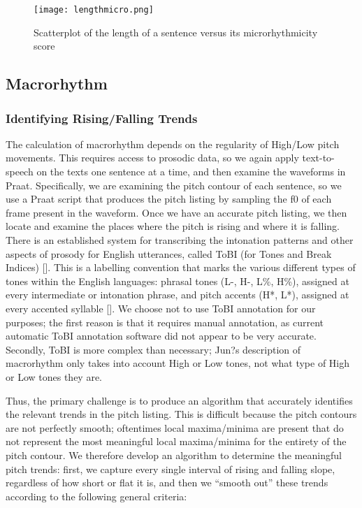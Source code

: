 \documentclass[pageno]{jpaper}
\newcommand{\quotes}[1]{``#1''}
\begin{document}
\begin{figure}[hbt]
\centering
\texttt{[image: lengthmicro.png]}
\caption{Scatterplot of the length of a sentence versus its microrhythmicity score}
\label{fig:lengthmicro}
\end{figure}

\subsection{Macrorhythm}
\subsubsection{Identifying Rising/Falling Trends}
The calculation of macrorhythm depends on the regularity of High/Low pitch movements. This requires access to prosodic data, so we again apply text-to-speech on the texts one sentence at a time, and then examine the waveforms in Praat. Specifically, we are examining the pitch contour of each sentence, so we use a Praat script that produces the pitch listing by sampling the f0 of each frame present in the waveform. Once we have an accurate pitch listing, we then locate and examine the places where the pitch is rising and where it is falling. There is an established system for transcribing the intonation patterns and other aspects of prosody for English utterances, called ToBI (for Tones and Break Indices) []. This is a labelling convention that marks the various different types of tones within the English languages: phrasal tones (L-, H-, L\%, H\%), assigned at every intermediate or intonation phrase, and pitch accents (H*, L*), assigned at every accented syllable []. We choose not to use ToBI annotation for our purposes; the first reason is that it requires manual annotation, as current automatic ToBI annotation software did not appear to be very accurate. Secondly, ToBI is more complex than necessary; Jun?s description of macrorhythm only takes into account High or Low tones, not what type of High or Low tones they are. 

Thus, the primary challenge is to produce an algorithm that accurately identifies the relevant trends in the pitch listing. This is difficult because the pitch contours are not perfectly smooth; oftentimes local maxima/minima are present that do not represent the most meaningful local maxima/minima for the entirety of the pitch contour. We therefore develop an algorithm to determine the meaningful pitch trends: first, we capture every single interval of rising and falling slope, regardless of how short or flat it is, and then we \quotes{smooth out} these trends according to the following general criteria:
\end{document}

